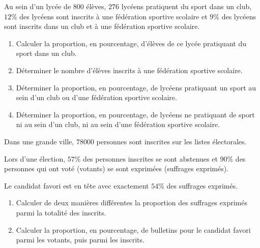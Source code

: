 \documentclass[a4paper]{article}
\begin{document}
  \medskip
  
  \begin{exercice}{}{}
  Au sein d'un lycée de $800$ élèves, $276$ lycéens pratiquent du sport dans un club, $12\%$ des lycéens sont inscrits à 
  une fédération sportive scolaire et $9\%$ des lycéens sont inscrits dans un club et à une fédération sportive scolaire.
  \begin{enumerate}
    \item Calculer la proportion, en pourcentage, d'élèves de ce lycée pratiquant du sport dans un club.
    \item Déterminer le nombre d'élèves inscrits à une fédération sportive scolaire.
    \item Déterminer la proportion, en pourcentage, de lycéens pratiquant un sport au sein d'un club ou d'une fédération sportive scolaire.
    \item Déterminer la proportion, en pourcentage, de lycéens ne pratiquant de sport ni au sein d'un club, ni au sein d'une fédération sportive scolaire.
  \end{enumerate}
  \end{exercice}
  
  
  \medskip
  
  \begin{exercice}{}{}
    Dans une grande ville, $78000$ personnes sont inscrites sur les listes électorales.
  
    Lors d'une élection, $57\%$ des personnes inscrites se sont abstenues et $90\%$ des personnes 
    qui ont voté (votants) se sont exprimées (suffrages exprimés).
    
    Le candidat favori est en tête avec exactement $54\%$ des suffrages exprimés.
    \begin{enumerate}
      \item Calculer de deux manières différentes la proportion des suffrages exprimés parmi la totalité des inscrits.
      \item Calculer la proportion, en pourcentage, de bulletins pour le candidat favori parmi les votants, puis parmi les inscrits.
    \end{enumerate}
  \end{exercice}
  
\end{document}
